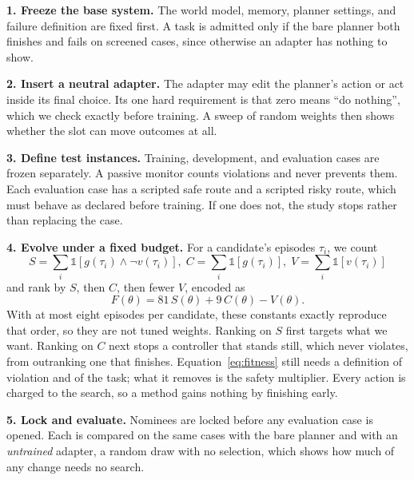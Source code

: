\documentclass[dvipsnames,format=sigconf]{acmart}
\newcommand{\ind}{\mathds{1}}
\begin{document}
\textbf{1. Freeze the base system.} The world model, memory, planner settings, and failure
definition are fixed first. A task is admitted only if the bare planner both finishes and fails on
screened cases, since otherwise an adapter has nothing to show.

\textbf{2. Insert a neutral adapter.} The adapter may edit the planner's action or act inside its
final choice. Its one hard requirement is that zero means ``do nothing'', which we check exactly
before training. A sweep of random weights then shows whether the slot can move outcomes at all.

\textbf{3. Define test instances.} Training, development, and evaluation cases are frozen
separately. A passive monitor counts violations and never prevents them. Each evaluation case has
a scripted safe route and a scripted risky route, which must behave as declared before training.
If one does not, the study stops rather than replacing the case.

\textbf{4. Evolve under a fixed budget.} For a candidate's episodes $\tau_i$, we count
\begin{equation}
  \textstyle
  S=\sum_i \ind[g(\tau_i) \wedge \neg v(\tau_i)],\;
  C=\sum_i \ind[g(\tau_i)],\;
  V=\sum_i \ind[v(\tau_i)]
  \label{eq:counts}
\end{equation}
and rank by $S$, then $C$, then fewer $V$, encoded as
\begin{equation}
  F(\theta) = 81\,S(\theta) + 9\,C(\theta) - V(\theta).
  \label{eq:fitness}
\end{equation}
With at most eight episodes per candidate, these constants exactly reproduce that order, so they
are not tuned weights. Ranking on $S$ first targets what we want. Ranking on $C$ next stops a
controller that stands still, which never violates, from outranking one that finishes.
Equation~\ref{eq:fitness} still needs a definition of violation and of the task; what it removes
is the safety multiplier. Every action is charged to the search, so a method gains nothing by
finishing early.

\textbf{5. Lock and evaluate.} Nominees are locked before any evaluation case is opened. Each is
compared on the same cases with the bare planner and with an \emph{untrained} adapter, a random
draw with no selection, which shows how much of any change needs no search.
\end{document}
